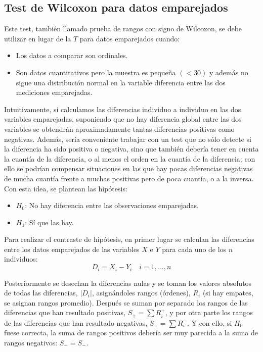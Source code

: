 \subsection{Test de Wilcoxon para datos emparejados}
Este test, también llamado prueba de rangos con signo de Wilcoxon, se debe utilizar en lugar de la $T$ para datos emparejados cuando:
\begin{itemize}
\item Los datos a comparar son ordinales.
\item Son datos cuantitativos pero la muestra es pequeña $(<30)$ y además no sigue una distribución normal en la variable diferencia entre
las dos mediciones emparejadas.
\end{itemize}

Intuitivamente, si calculamos las diferencias individuo a individuo en las dos variables emparejadas, suponiendo que no hay diferencia
global entre las dos variables se obtendrán aproximadamente tantas diferencias positivas como negativas. Además, sería conveniente trabajar
con un test que no sólo detecte si la diferencia ha sido positiva o negativa, sino que también debería tener en cuenta la cuantía de la
diferencia, o al menos el orden en la cuantía de la diferencia; con ello se podrían compensar situaciones en las que hay pocas diferencias
negativas de mucha cuantía frente a muchas positivas pero de poca cuantía, o a la inversa. Con esta idea, se plantean las hipótesis:
\begin{itemize}
\item $H_0$: No hay diferencia entre las observaciones emparejadas.
\item $H_1$: Sí que las hay.
\end{itemize}

Para realizar el contraste de hipótesis, en primer lugar se calculan las diferencias entre los datos emparejados de las variables $X$ e $Y$
para cada uno de los $n$ individuos:
\[
D_i  = X_i  - Y_i \quad i = 1,...,n
\]

Posteriormente se desechan la diferencias nulas y se toman los valores absolutos de todas las diferencias, $\left|{D_i}\right|$,
asignándoles rangos (órdenes), $R_i$ (si hay empates, se asignan rangos promedio). Después se suman por separado los rangos de las
diferencias que han resultado positivas, $S_{+}=\sum{R_{i}^{+}}$, y por otra parte los rangos de las diferencias que han resultado
negativas, $S_{-}=\sum{R_{i}^{-}}$. Y con ello, si $H_0$ fuese correcta, la suma de rangos positivos debería ser muy parecida a la suma de
rangos negativos: $S_+=S_-$.

